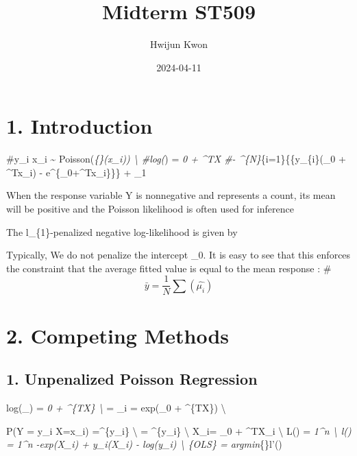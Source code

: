 \documentclass[
]{article}
\title{Midterm ST509}
\author{Hwijun Kwon}
\date{2024-04-11}
\begin{document}
\maketitle

\hypertarget{introduction}{%
\section{1. Introduction}\label{introduction}}

\#y\_i \textbar x\_i \sim{} Poisson(\mu\emph{\{\beta\}(x\_i))
\textbackslash{} \#log(\mu}) = \beta\emph{0 + \beta\^{}TX
\#- \sum\^{}\{N\}}\{i=1\}\{\{y\_\{i\}(\beta\_0 +
\beta\^{}Tx\_i) - e\^{}\{\beta\_0+\beta\^{}Tx\_i\}\}\} +
\lambda \textbar\textbar{}\beta\textbar\textbar\_1

When the response variable Y is nonnegative and represents a count, its
mean will be positive and the Poisson likelihood is often used for
inference

The l\_\{1\}-penalized negative log-likelihood is given by

Typically, We do not penalize the intercept \beta\_0. It is easy to see
that this enforces the constraint that the average fitted value is equal
to the mean response : \#\[\bar{y} = \frac{1}{N}\sum(\hat{\mu_i})\]

\hypertarget{competing-methods}{%
\section{2. Competing Methods}\label{competing-methods}}

\hypertarget{unpenalized-poisson-regression}{%
\subsection{1. Unpenalized Poisson
Regression}\label{unpenalized-poisson-regression}}

log(\mu\_) = \beta\emph{0 + \beta\^{}\{TX\} \textbackslash{}
\mu} = \lambda\_i = exp(\beta\_0 + \beta\^{}\{TX\})
\textbackslash{}

P(Y = y\_i \textbar{} X=x\_i)
=\^{}\{y\_i\} \textbackslash{} =
\^{}\{y\_i\}
\textbackslash{} X\_i\beta = \beta\_0 + \beta\^{}TX\_i \textbackslash{}
L(\beta) = \prod\emph{1\^{}n
 \textbackslash{}
l(\beta) = \sum\emph{1\^{}n -exp(X\_i\beta) + \sum y\_i(X\_i\beta) -
\sum log(y\_i) \textbackslash{} \beta}\{OLS\} =
argmin}\{\beta\}l'(\beta)
\end{document}

